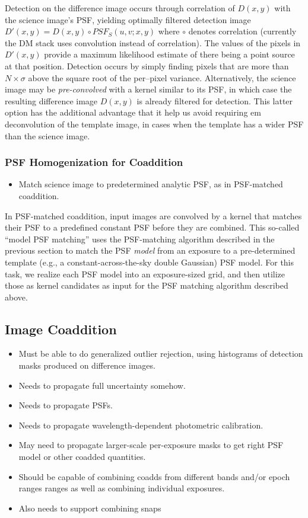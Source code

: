 Detection on the difference image occurs through correlation of $D(x,y)$ with the science image's PSF, yielding optimally filtered detection image $D'(x,y) = D(x,y) \circ PSF_S(u,v;x,y)$ where $\circ$ denotes correlation (currently the DM stack uses convolution instead of correlation). The values of the pixels in $D'(x,y)$ provide a maximum likelihood estimate of there being a point source at that position. Detection occurs by simply finding pixels that are more than $N \times \sigma$ above the square root of the per--pixel variance. Alternatively, the science image may be {\em pre-convolved} with a kernel similar to its PSF, in which case the resulting difference image $D(x,y)$ is already filtered for detection. This latter option has the additional advantage that it help us avoid requiring {em deconvolution} of the template image, in cases when the template has a wider PSF than the science image. 

\subsubsection{PSF Homogenization for Coaddition}
\label{sec:acPSFHomogenization}
\begin{itemize}
\item Match science image to predetermined analytic PSF, as in PSF-matched coaddition.
\end{itemize}

In PSF-matched coaddition, input images are convolved by a kernel that matches their PSF to a predefined constant PSF before they are combined. This so-called ``model PSF matching'' uses the PSF-matching algorithm described in the previous section to match the PSF {\em   model} from an exposure to a pre-determined template (e.g., a constant-across-the-sky double Gaussian) PSF model. For this task, we realize each PSF model into an exposure-sized grid, and then utilize those as kernel candidates as input for the PSF matching algorithm described above. 

\subsection{Image Coaddition}
\label{sec:acCoaddition}
\begin{itemize}
\item Must be able to do generalized outlier rejection, using histograms of detection masks produced on difference images.
\item Needs to propagate full uncertainty somehow.
\item Needs to propagate PSFs.
\item Needs to propagate wavelength-dependent photometric calibration.
\item May need to propagate larger-scale per-exposure masks to get right PSF model or other coadded quantities.
\item Should be capable of combining coadds from different bands and/or epoch ranges ranges as well as combining individual exposures.
\item Also needs to support combining snaps
\end{itemize}

